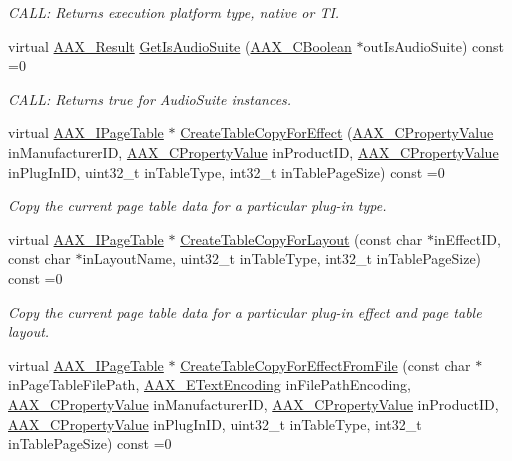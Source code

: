 \begin{DoxyCompactItemize}
\begin{DoxyCompactList}\small\item\em C\+A\+L\+L\+: Returns execution platform type, native or T\+I. \end{DoxyCompactList}\item 
virtual \hyperlink{a00149_a4d8f69a697df7f70c3a8e9b8ee130d2f}{A\+A\+X\+\_\+\+Result} \hyperlink{a00090_af6d44bc336c3c2e4cca1a1684b556db3}{Get\+Is\+Audio\+Suite} (\hyperlink{a00149_aa216506530f1d19a2965931ced2b274b}{A\+A\+X\+\_\+\+C\+Boolean} $\ast$out\+Is\+Audio\+Suite) const =0
\begin{DoxyCompactList}\small\item\em C\+A\+L\+L\+: Returns true for Audio\+Suite instances. \end{DoxyCompactList}\item 
virtual \hyperlink{a00107}{A\+A\+X\+\_\+\+I\+Page\+Table} $\ast$ \hyperlink{a00090_acd6c896d35ee2c36e8f6685f0c8592ad}{Create\+Table\+Copy\+For\+Effect} (\hyperlink{a00149_ab247c0d8686c14e05cbb567ef276f249}{A\+A\+X\+\_\+\+C\+Property\+Value} in\+Manufacturer\+I\+D, \hyperlink{a00149_ab247c0d8686c14e05cbb567ef276f249}{A\+A\+X\+\_\+\+C\+Property\+Value} in\+Product\+I\+D, \hyperlink{a00149_ab247c0d8686c14e05cbb567ef276f249}{A\+A\+X\+\_\+\+C\+Property\+Value} in\+Plug\+In\+I\+D, uint32\+\_\+t in\+Table\+Type, int32\+\_\+t in\+Table\+Page\+Size) const =0
\begin{DoxyCompactList}\small\item\em Copy the current page table data for a particular plug-\/in type. \end{DoxyCompactList}\item 
virtual \hyperlink{a00107}{A\+A\+X\+\_\+\+I\+Page\+Table} $\ast$ \hyperlink{a00090_ab35931f5055849da04566d51e17665af}{Create\+Table\+Copy\+For\+Layout} (const char $\ast$in\+Effect\+I\+D, const char $\ast$in\+Layout\+Name, uint32\+\_\+t in\+Table\+Type, int32\+\_\+t in\+Table\+Page\+Size) const =0
\begin{DoxyCompactList}\small\item\em Copy the current page table data for a particular plug-\/in effect and page table layout. \end{DoxyCompactList}\item 
virtual \hyperlink{a00107}{A\+A\+X\+\_\+\+I\+Page\+Table} $\ast$ \hyperlink{a00090_aad15c4d6b9943cdd9a5143622524eb1e}{Create\+Table\+Copy\+For\+Effect\+From\+File} (const char $\ast$in\+Page\+Table\+File\+Path, \hyperlink{a00206_a8152e57310850693e4e7f00fc4922d74}{A\+A\+X\+\_\+\+E\+Text\+Encoding} in\+File\+Path\+Encoding, \hyperlink{a00149_ab247c0d8686c14e05cbb567ef276f249}{A\+A\+X\+\_\+\+C\+Property\+Value} in\+Manufacturer\+I\+D, \hyperlink{a00149_ab247c0d8686c14e05cbb567ef276f249}{A\+A\+X\+\_\+\+C\+Property\+Value} in\+Product\+I\+D, \hyperlink{a00149_ab247c0d8686c14e05cbb567ef276f249}{A\+A\+X\+\_\+\+C\+Property\+Value} in\+Plug\+In\+I\+D, uint32\+\_\+t in\+Table\+Type, int32\+\_\+t in\+Table\+Page\+Size) const =0

\end{DoxyCompactItemize}
